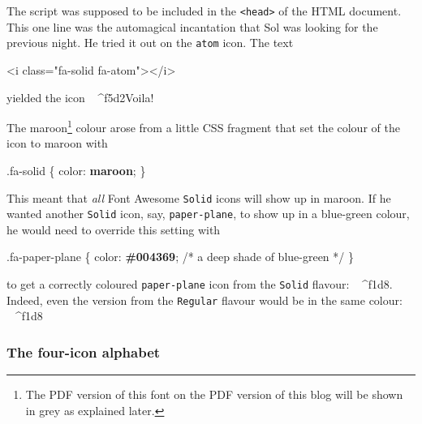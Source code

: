 \documentclass[
  british,
  a4paper,
  rgb,
  dvipsnames,
  svgnames,
  hyphens]{article}
\newenvironment{Shaded}{\begin{snugshade}}{\end{snugshade}}
\newcommand{\CommentTok}[1]{\textcolor[rgb]{0.50,0.62,0.50}{#1}}
\newcommand{\ConstantTok}[1]{\textcolor[rgb]{0.86,0.64,0.64}{\textbf{#1}}}
\newcommand{\ErrorTok}[1]{\textcolor[rgb]{0.76,0.75,0.62}{#1}}
\newcommand{\FunctionTok}[1]{\textcolor[rgb]{0.94,0.94,0.56}{#1}}
\newcommand{\KeywordTok}[1]{\textcolor[rgb]{0.94,0.87,0.69}{#1}}
\newcommand{\NormalTok}[1]{\textcolor[rgb]{0.80,0.80,0.80}{#1}}
\newcommand{\OperatorTok}[1]{\textcolor[rgb]{0.94,0.94,0.82}{#1}}
\newcommand{\OtherTok}[1]{\textcolor[rgb]{0.94,0.94,0.56}{#1}}
\newcommand{\StringTok}[1]{\textcolor[rgb]{0.80,0.58,0.58}{#1}}
\newcommand{\faAtom}{\solidiconfont\ ^^^^f5d2\normalfont}
\newcommand{\faPaperPlaneRegular}{\regulariconfont\ ^^^^f1d8\normalfont}
\newcommand{\faPaperPlaneSolid}{\solidiconfont\ ^^^^f1d8\normalfont}
\begin{document}
The script was supposed to be included in the
\texttt{\textless{}head\textgreater{}} of the HTML document. This one
line was the automagical incantation that Sol was looking for the
previous night. He tried it out on the \texttt{atom} icon. The text

\begin{Shaded}
\begin{Highlighting}[]
\KeywordTok{\textless{}i} \ErrorTok{class}\OtherTok{=}\StringTok{"fa{-}solid fa{-}atom"}\KeywordTok{\textgreater{}\textless{}/i\textgreater{}}
\end{Highlighting}
\end{Shaded}

yielded the icon \faAtom Voila!

The maroon\footnote{The PDF version of this font on the PDF version of
  this blog will be shown in grey as explained later.} colour arose from
a little CSS fragment that set the colour of the icon to maroon with

\begin{Shaded}
\begin{Highlighting}[]
\FunctionTok{.fa{-}solid}\NormalTok{ \{}
    \KeywordTok{color}\NormalTok{: }\ConstantTok{maroon}\OperatorTok{;}
\NormalTok{\}}
\end{Highlighting}
\end{Shaded}

This meant that \emph{all} Font Awesome \texttt{Solid} icons will show
up in maroon. If he wanted another \texttt{Solid} icon, say,
\texttt{paper-plane}, to show up in a blue-green colour, he would need
to override this setting with

\begin{Shaded}
\begin{Highlighting}[]
\FunctionTok{.fa{-}paper{-}plane}\NormalTok{ \{}
    \KeywordTok{color}\NormalTok{: }\ConstantTok{\#004369}\OperatorTok{;} \CommentTok{/* a deep shade of blue{-}green */}
\NormalTok{\}}
\end{Highlighting}
\end{Shaded}

to get a correctly coloured \texttt{paper-plane} icon from the
\texttt{Solid} flavour: \faPaperPlaneSolid . Indeed, even the version
from the \texttt{Regular} flavour would be in the same colour:
\faPaperPlaneRegular

\hypertarget{the-four-icon-alphabet}{%
\subsubsection{The four-icon alphabet}\label{the-four-icon-alphabet}}
\end{document}
